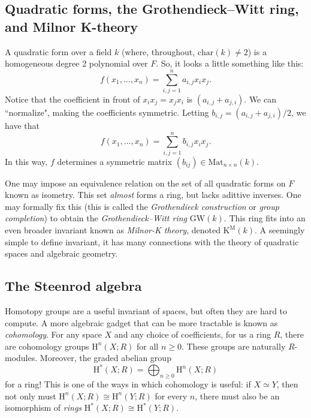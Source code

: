 \documentclass[10pt]{amsart}
\theoremstyle{definition}
\newcommand{\cdef}[1]{\textcolor{Bittersweet}{#1}}
\begin{document}
\subsection*{Quadratic forms, the Grothendieck--Witt ring, and Milnor K-theory}
A \cdef{quadratic form} over a field $k$ (where, throughout, $\mathrm{char}(k) \neq 2$) is a homogeneous degree 2 polynomial over $F$. So, it looks a little something like this:
\[
f(x_1, \dots, x_n) = \sum_{i, j = 1}^na_{i,j}x_ix_j.
\]
Notice that the coefficient in front of $x_ix_j = x_jx_i$ is $(a_{i,j} + a_{j,i})$. We can ``normalize", making the coefficients symmetric. Letting $b_{i,j} = (a_{i,j} + a_{j, i})/2$, we have that
\[
f(x_1, \dots, x_n) = \sum_{i, j =1}^nb_{i,j}x_ix_j.
\]
In this way, $f$ determines a symmetric matrix $(b_{ij}) \in \mathrm{Mat}_{n \times n}(k)$. 

One may impose an equivalence relation on the set of all quadratic forms on $F$ known as isometry. This set \emph{almost} forms a ring, but lacks adittive inverses. One may formally fix this (this is called the \emph{Grothendieck construction} or \emph{group completion}) to obtain the \cdef{\emph{Grothendieck--Witt ring}} $\mathrm{GW}(k)$. This ring fits into an even broader invariant known as \cdef{\emph{Milnor-K theory}}, denoted $\text{K}^\text{M}(k)$. A seemingly simple to define invariant, it has many connections with the theory of quadratic spaces and algebraic geometry.


\subsection*{The Steenrod algebra}
Homotopy groups are a useful invariant of spaces, but often they are hard to compute. A more algebraic gadget that can be more tractable is known as \cdef{\emph{cohomology}}. For any space $X$ and any choice of coefficients, for us a ring $R$, there are cohomology groups $\text{H}^n(X; R)$ for all $n \geq 0$. These groups are naturally $R$-modules. Moreover, the graded abelian group
\[
\text{H}^*(X; R) = \bigoplus_{n \geq 0}\text{H}^n(X; R)
\]
for a ring! This is one of the ways in which cohomology is useful: if $X \simeq Y$, then not only must $\text{H}^n(X; R) \cong \text{H}^n(Y; R)$ for every $n$, there must also be an isomorphism of \emph{rings} $\text{H}^*(X; R) \cong \text{H}^*(Y; R)$.
\end{document}
